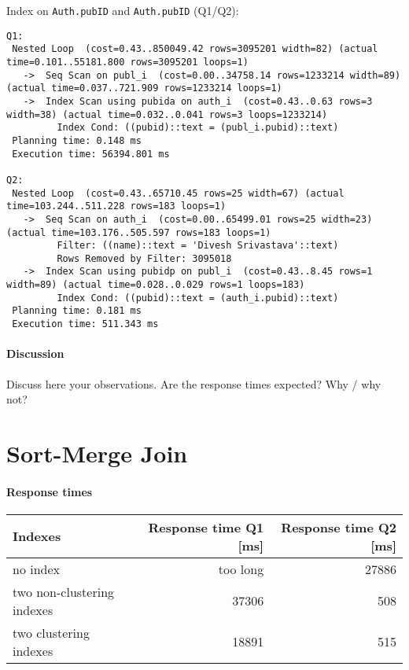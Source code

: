 \documentclass[11pt]{scrartcl}
\begin{document}
\noindent Index on {\tt Auth.pubID} and {\tt Auth.pubID} (Q1/Q2):
{\small
\begin{verbatim}
Q1:
 Nested Loop  (cost=0.43..850049.42 rows=3095201 width=82) (actual time=0.101..55181.800 rows=3095201 loops=1)
   ->  Seq Scan on publ_i  (cost=0.00..34758.14 rows=1233214 width=89) (actual time=0.037..721.909 rows=1233214 loops=1)
   ->  Index Scan using pubida on auth_i  (cost=0.43..0.63 rows=3 width=38) (actual time=0.032..0.041 rows=3 loops=1233214)
         Index Cond: ((pubid)::text = (publ_i.pubid)::text)
 Planning time: 0.148 ms
 Execution time: 56394.801 ms

Q2:
 Nested Loop  (cost=0.43..65710.45 rows=25 width=67) (actual time=103.244..511.228 rows=183 loops=1)
   ->  Seq Scan on auth_i  (cost=0.00..65499.01 rows=25 width=23) (actual time=103.176..505.597 rows=183 loops=1)
         Filter: ((name)::text = 'Divesh Srivastava'::text)
         Rows Removed by Filter: 3095018
   ->  Index Scan using pubidp on publ_i  (cost=0.43..8.45 rows=1 width=89) (actual time=0.028..0.029 rows=1 loops=183)
         Index Cond: ((pubid)::text = (auth_i.pubid)::text)
 Planning time: 0.181 ms
 Execution time: 511.343 ms
\end{verbatim}
}

\paragraph{Discussion}
Discuss here your observations. Are the response times expected? Why / why
not? 

\section{Sort-Merge Join}

\paragraph{Response times}

\begin{flushleft}
\begin{tabular}{l|r|r}
  Indexes & Response time Q1 [ms] & Response time Q2 [ms] \\
  \hline
  no index & too long & 27886 \\
  two non-clustering indexes & 37306 & 508 \\
  two clustering indexes & 18891 & 515  \\
\end{tabular}
\end{flushleft}
\end{document}

